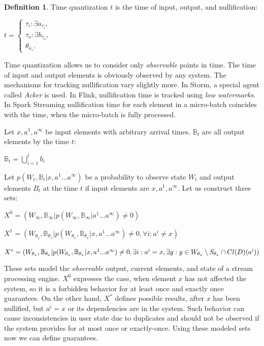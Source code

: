 \documentclass[sigconf]{acmart}
\theoremstyle{definition}
\newtheorem{definition}{Definition}
\begin{document}
\begin{definition}{Time quantization}
$t$ is the time of input, output, and nullification:

$t=\begin{cases}
\tau_i:\exists{a_{\tau_i}}, \\
\tau_o:\exists{b_{\tau_o}}, \\
\theta_{a_\tau}.
\end{cases}$
\end{definition}

Time quantization allows us to consider only {\em observable} points in time. The time of input and output elements is obviously observed by any system. The mechanisms for tracking nullification vary slightly more. In Storm, a special agent called {\em Acker} is used. In Flink, nullification time is tracked using {\em low watermarks}. In Spark Streaming nullification time for each element in a micro-batch coincides with the time, when the micro-batch is fully processed.

Let $x,a^{1},a^\infty$ be input elements with arbitrary arrival times. $\mathbb{B}_t$ are all output elements by the time $t$:

$\mathbb{B}_t=\bigcup\limits_{i=1}^{t}{b_i}$

Let $p(W_t,\mathbb{B}_t|x,a^{1}...a^\infty)$ be a probability to observe state $W_t$ and output elements $B_t$ at the time $t$ if input elements are $x,a^{1},a^\infty$. Let us construct three sets:

$X^0=(W_\infty,\mathbb{B}_\infty|p(W_\infty,\mathbb{B}_\infty|a^{1}...a^\infty)\neq{0})$

$X^1=(W_{\theta_{x}},\mathbb{B}_{\theta_{x}}|p(W_{\theta_{x}},\mathbb{B}_{\theta_{x}}|x,a^{1}...a^\infty)\neq{0},\forall{i}:{a^i}\neq{x})$

$X^{*}=(W_{\theta_{x}},\mathbb{B}_{\theta_{x}}|p(W_{\theta_{x}},\mathbb{B}_{\theta_{x}}|x,a^{1}...a^\infty)\neq{0},\\
\exists{i}:{a^i={x}},\exists{y:y\in{W_{\theta_{x}}\setminus{S_{\theta_x}}}\cap{Cl(D)(a^i)}})$

These sets model the {\em observable} output, current elements, and state of a stream processing engine. $X^0$ expresses the case, when element $x$ has not affected the system, so it is a forbidden behavior for at least once and exactly once guarantees. On the other hand, $X^{*}$ defines possible results, after $x$ has been nullified, but $a^i=x$ or its dependencies are in the system. Such behavior can cause inconsistencies in user state due to duplicates and should not be observed if the system provides for at most once or exactly-once. Using these modeled sets now we can define guarantees.
\end{document}
